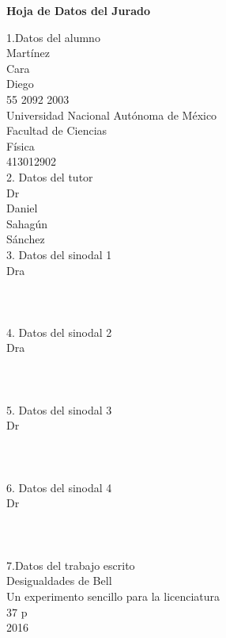 \documentclass[12pt,twoside]{article}
\begin{document}
\clearpage
\begin{center}
\Large \textbf{Hoja de Datos del Jurado}
\end{center}
\small

1.Datos del alumno\\
Martínez\\
Cara\\
Diego\\
55 2092 2003\\
Universidad Nacional Autónoma de México\\
Facultad de Ciencias \\
Física\\
413012902
\vspace{0.2cm}\\
2. Datos del tutor\\
Dr\\
Daniel\\
Sahagún\\
Sánchez
\vspace{0.2cm}\\
3. Datos del sinodal 1\\
Dra\\
\\
\\
\vspace{0.2cm}\\
4. Datos del sinodal 2 \\
Dra\\
\\
\\
\vspace{0.2cm}\\
5. Datos del sinodal 3 \\ 
Dr\\
\\
\\
\vspace{0.2cm}\\
6. Datos del sinodal 4 \\
Dr\\
\\
\\
\vspace{0.2cm}\\
7.Datos del trabajo escrito\\
Desigualdades de Bell\\
Un experimento sencillo para la licenciatura\\
37 p\\
2016


\clearpage
\end{document}
